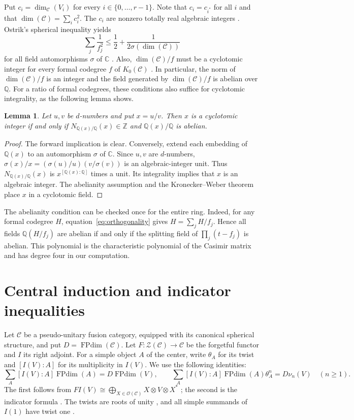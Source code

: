 \documentclass[11pt]{amsart}
\newtheorem{lemma}[theorem]{Lemma}
\theoremstyle{definition}
\DeclareMathOperator{\FPdim}{FPdim}
\newcommand{\C}{\mathbb C}
\newcommand{\Q}{\mathbb Q}
\newcommand{\Z}{\mathbb Z}
\numberwithin{equation}{section}
\begin{document}
Put $c_i=\dim_{\mathcal C}(V_i)$ for every $i\in\{0,\dots,r-1\}$. 
Note that $c_i=c_{i^*}$ for all $i$ and that $\dim(\mathcal C)=\sum_i c_i^2$. 
The $c_i$ are nonzero totally real algebraic integers \cite[\S2.1]{OstrikRank3}.
Ostrik's spherical inequality yields
\begin{equation}\label{eq:spherical-mass}
\sum_j \frac{1}{f_j^2} \leq\frac12+\frac1{2\sigma(\dim(\mathcal C))}
\end{equation}
for all field automorphisms $\sigma$ of $\C$ \cite[Theorem~3.1.1 and Remark~3.1.2]{OstrikGlobal}.  
Also, $\dim(\mathcal C)/f$ must be a cyclotomic integer for every formal codegree $f$ of $K_0(\mathcal{C})$ \cite[Theorem~2.13]{OstrikRank3}.
In particular, the norm of $\dim(\mathcal C)/f$ is an integer and the field generated by $\dim(\mathcal C)/f$ is abelian over $\Q$. 
For a ratio of formal codegrees, these conditions also suffice for cyclotomic integrality, as the following lemma shows. 

\begin{lemma}\label{lem:codegree-ratio}
Let $u,v$ be $d$-numbers and put $x=u/v$. Then $x$ is a cyclotomic
integer if and only if $N_{\Q(x)/\Q}(x)\in\Z$ and $\Q(x)/\Q$ is abelian.
\end{lemma}
\begin{proof}
The forward implication is clear. Conversely, extend each embedding of
$\Q(x)$ to an automorphism $\sigma$ of $\C$. Since $u,v$ are $d$-numbers,
$\sigma(x)/x=(\sigma(u)/u)(v/\sigma(v))$ is an algebraic-integer unit.
Thus $N_{\Q(x)/\Q}(x)$ is $x^{[\Q(x):\Q]}$ times a unit. Its integrality
implies that $x$ is an algebraic integer. The abelianity assumption and
the Kronecker--Weber theorem place $x$ in a cyclotomic field.
\end{proof}

The abelianity condition can be checked once for the entire ring.
Indeed, for any formal codegree $H$, equation~\eqref{eq:orthogonality}
gives $H=\sum_jH/f_j$. Hence all fields $\Q(H/f_j)$ are abelian
if and only if the splitting field of $\prod_j(t-f_j)$ is abelian.
This polynomial is the characteristic polynomial of the Casimir matrix
and has degree four in our computation.

\section{Central induction and indicator inequalities}\label{sec:central}
Let $\mathcal C$ be a pseudo-unitary fusion category, equipped with its
canonical spherical structure, and put $D=\FPdim(\mathcal C)$.
Let $F:\mathcal Z(\mathcal C)\to\mathcal C$ be the forgetful functor
and $I$ its right adjoint. For a simple object $A$ of the center, write
$\theta_A$ for its twist and $[I(V):A]$ for its multiplicity in $I(V)$.
We use the following identities:
\[
 \sum_A[I(V):A]\FPdim(A)=D\FPdim(V),\qquad
 \sum_A[I(V):A]\FPdim(A)\theta_A^n=D\nu_n(V)\quad(n\geq1).
\]
The first follows from
$FI(V)\cong\bigoplus_{X\in\mathcal O(\mathcal C)}X\otimes V\otimes X^*$
\cite[Proposition~2.4]{OstrikRank3}; the second is the indicator formula
\cite[Theorem~4.1]{NgSchauenburg}. The twists are roots of unity
\cite[Theorem~5.5]{NgSchauenburg}, and all simple summands of $I(1)$
have twist one \cite[Theorem~2.5]{OstrikRank3}.
\end{document}
